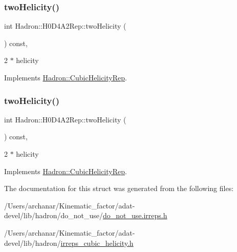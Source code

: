 \subsubsection{\texorpdfstring{twoHelicity()}{twoHelicity()}\hspace{0.1cm}{\footnotesize\ttfamily [2/3]}}
{\footnotesize\ttfamily int Hadron\+::\+H0\+D4\+A2\+Rep\+::two\+Helicity (\begin{DoxyParamCaption}{ }\end{DoxyParamCaption}) const\hspace{0.3cm}{\ttfamily [inline]}, {\ttfamily [virtual]}}

2 $\ast$ helicity 

Implements \mbox{\hyperlink{structHadron_1_1CubicHelicityRep_af507aa56fc2747eacc8cb6c96db31ecc}{Hadron\+::\+Cubic\+Helicity\+Rep}}.

\mbox{\label{structHadron_1_1H0D4A2Rep_a578e119705a5020872b1e872705ac47e}} 
\subsubsection{\texorpdfstring{twoHelicity()}{twoHelicity()}\hspace{0.1cm}{\footnotesize\ttfamily [3/3]}}
{\footnotesize\ttfamily int Hadron\+::\+H0\+D4\+A2\+Rep\+::two\+Helicity (\begin{DoxyParamCaption}{ }\end{DoxyParamCaption}) const\hspace{0.3cm}{\ttfamily [inline]}, {\ttfamily [virtual]}}

2 $\ast$ helicity 

Implements \mbox{\hyperlink{structHadron_1_1CubicHelicityRep_af507aa56fc2747eacc8cb6c96db31ecc}{Hadron\+::\+Cubic\+Helicity\+Rep}}.



The documentation for this struct was generated from the following files\+:\begin{DoxyCompactItemize}
\item 
/\+Users/archanar/\+Kinematic\+\_\+factor/adat-\/devel/lib/hadron/do\+\_\+not\+\_\+use/\mbox{\hyperlink{adat-devel_2lib_2hadron_2do__not__use_2do__not__use_8irreps_8h}{do\+\_\+not\+\_\+use.\+irreps.\+h}}\item 
/\+Users/archanar/\+Kinematic\+\_\+factor/adat-\/devel/lib/hadron/\mbox{\hyperlink{adat-devel_2lib_2hadron_2irreps__cubic__helicity_8h}{irreps\+\_\+cubic\+\_\+helicity.\+h}}\end{DoxyCompactItemize}
